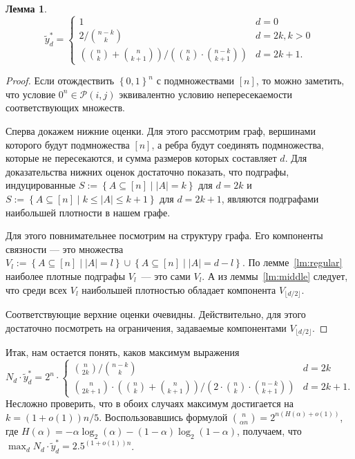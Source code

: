 \documentclass[12pt]{article}
\newcommand{\set}[1]{\left\{#1\right\}}
\newcommand{\abs}[1]{\left|#1\right|}
\newcommand{\zo}{\set{0, 1}}
\newcommand{\Pc}{\mathcal{P}}
\newcommand{\setst}[2]{\set{#1 \mid #2}}
\newtheorem{lemma}{Лемма}
\begin{document}
    \begin{lemma}
        $$
            \tilde{y}_d^* = \begin{cases}
                1 & d = 0 \\
                2 / \binom{n - k}{k} & d = 2k, k > 0 \\
                \left(\binom{n}{k} + \binom{n}{k + 1}\right) / \left(\binom{n}{k} \cdot \binom{n - k}{k + 1}\right) & d = 2k + 1.
            \end{cases}
        $$
    \end{lemma}
    \begin{proof}
        Если отождествить $\zo^n$ с подмножествами $[n]$, то можно заметить, что условие $0^n \in \Pc(i, j)$ эквивалентно условию непересекаемости соответствующих множеств.

        Сперва докажем нижние оценки.
        Для этого рассмотрим граф, вершинами которого будут подмножества $[n]$, а ребра будут соединять подмножества,
        которые не пересекаются, и сумма размеров которых составляет $d$.
        Для доказательства нижних оценок достаточно показать, что подграфы,
        индуцированные $S := \setst{A \subseteq [n]}{\abs{A} = k}$ для $d = 2k$ и $S := \setst{A \subseteq [n]}{k \leq \abs{A} \leq k + 1}$
        для $d = 2k + 1$, являются подграфами наибольшей плотности в нашем графе.

        Для этого повнимательнее посмотрим на структуру графа. Его компоненты связности --- это множества
        $V_l := \setst{A \subseteq [n]}{\abs{A} = l} \cup \setst{A \subseteq [n]}{\abs{A} = d - l}$.
        По лемме~\ref{lm:regular} наиболее плотные подграфы $V_l$~--- это сами $V_l$. А из леммы~\ref{lm:middle} следует, что
        среди всех $V_l$ наибольшей плотностью обладает компонента $V_{\lfloor d / 2\rfloor}$.

        Соответствующие верхние оценки очевидны. Действительно, для этого достаточно посмотреть на ограничения, задаваемые компонентами $V_{\lfloor d / 2\rfloor}$.

    \end{proof}

    Итак, нам остается понять, каков максимум выражения
    $$
        N_d \cdot \tilde{y}_d^* = 2^n \cdot \begin{cases}
            \binom{n}{2k} / \binom{n - k}{k} & d = 2k \\
            \binom{n}{2k + 1} \cdot \left(\binom{n}{k} + \binom{n}{k + 1}\right) / \left(2 \cdot \binom{n}{k} \cdot \binom{n - k}{k + 1}\right) & d = 2k + 1.
        \end{cases}
    $$
    Несложно проверить, что в обоих случаях максимум достигается на $k = (1 + o(1)) n / 5$. Воспользовавшись формулой $\binom{n}{\alpha n}=2^{n(H(\alpha)+o(1))}$, где $H(\alpha) = -\alpha\log_2(\alpha) -(1-\alpha)\log_2(1-\alpha)$, получаем, что $\max_d N_d \cdot \tilde{y}_d^* = 2.5^{(1+o(1))n}$.
\end{document}
